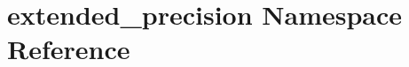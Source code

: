 \hypertarget{namespaceextended__precision}{}\section{extended\+\_\+precision Namespace Reference}
\label{namespaceextended__precision}
